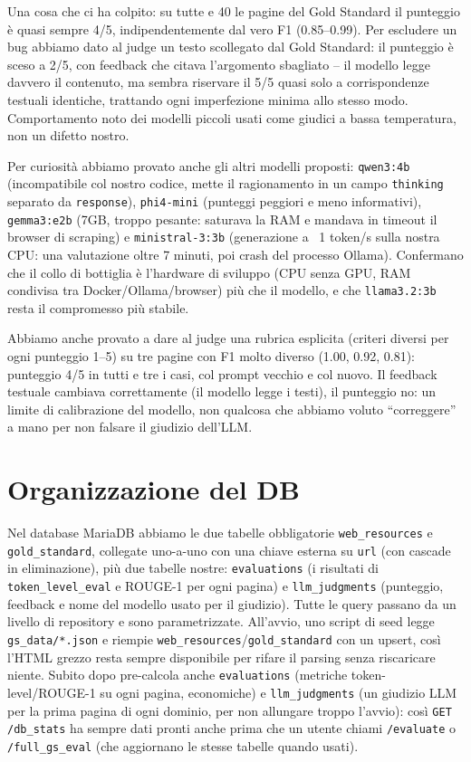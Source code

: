\documentclass[11pt]{article}
\begin{document}
Una cosa che ci ha colpito: su tutte e 40 le pagine del Gold Standard il
punteggio è quasi sempre 4/5, indipendentemente dal vero F1 (0.85--0.99).
Per escludere un bug abbiamo dato al judge un testo scollegato dal Gold
Standard: il punteggio è sceso a 2/5, con feedback che citava l'argomento
sbagliato -- il modello legge davvero il contenuto, ma sembra riservare il
5/5 quasi solo a corrispondenze testuali identiche, trattando ogni
imperfezione minima allo stesso modo. Comportamento noto dei modelli
piccoli usati come giudici a bassa temperatura, non un difetto nostro.

Per curiosità abbiamo provato anche gli altri modelli proposti:
\texttt{qwen3:4b} (incompatibile col nostro codice, mette il ragionamento
in un campo \texttt{thinking} separato da \texttt{response}),
\texttt{phi4-mini} (punteggi peggiori e meno informativi),
\texttt{gemma3:e2b} (7GB, troppo pesante: saturava la RAM e mandava in
timeout il browser di scraping) e \texttt{ministral-3:3b} (generazione a
~1 token/s sulla nostra CPU: una valutazione oltre 7 minuti, poi crash del
processo Ollama). Confermano che il collo di bottiglia è l'hardware di
sviluppo (CPU senza GPU, RAM condivisa tra Docker/Ollama/browser) più che
il modello, e che \texttt{llama3.2:3b} resta il compromesso più stabile.

Abbiamo anche provato a dare al judge una rubrica esplicita (criteri
diversi per ogni punteggio 1--5) su tre pagine con F1 molto diverso (1.00,
0.92, 0.81): punteggio 4/5 in tutti e tre i casi, col prompt vecchio e col
nuovo. Il feedback testuale cambiava correttamente (il modello legge i
testi), il punteggio no: un limite di calibrazione del modello, non
qualcosa che abbiamo voluto ``correggere'' a mano per non falsare il
giudizio dell'LLM.

\section{Organizzazione del DB}

Nel database MariaDB abbiamo le due tabelle obbligatorie
\texttt{web\_resources} e \texttt{gold\_standard}, collegate uno-a-uno con
una chiave esterna su \texttt{url} (con cascade in eliminazione), più due
tabelle nostre: \texttt{evaluations} (i risultati di
\texttt{token\_level\_eval} e ROUGE-1 per ogni pagina) e
\texttt{llm\_judgments} (punteggio, feedback e nome del modello usato per il
giudizio). Tutte le query passano da un livello di repository e sono
parametrizzate. All'avvio, uno script di seed legge \texttt{gs\_data/*.json}
e riempie \texttt{web\_resources}/\texttt{gold\_standard} con un upsert,
così l'HTML grezzo resta sempre disponibile per rifare il parsing senza
riscaricare niente. Subito dopo pre-calcola anche \texttt{evaluations}
(metriche token-level/ROUGE-1 su ogni pagina, economiche) e
\texttt{llm\_judgments} (un giudizio LLM per la prima pagina di ogni
dominio, per non allungare troppo l'avvio): così \texttt{GET /db\_stats} ha
sempre dati pronti anche prima che un utente chiami \texttt{/evaluate} o
\texttt{/full\_gs\_eval} (che aggiornano le stesse tabelle quando usati).
\end{document}
